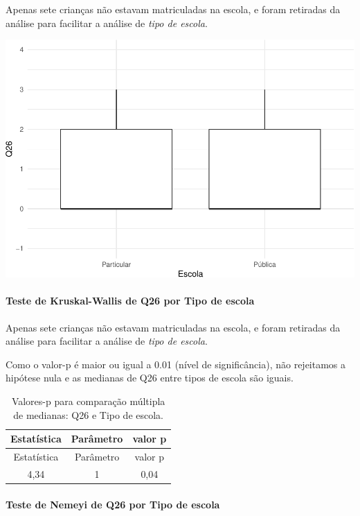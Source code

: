 \documentclass[]{article}
\let\oldparagraph\paragraph
\renewcommand{\paragraph}[1]{\oldparagraph{#1}\mbox{}}
\begin{document}
Apenas sete crianças não estavam matriculadas na escola, e foram retiradas da análise para facilitar a análise de \emph{tipo de escola}.

\begin{center}\includegraphics[width=0.75\linewidth]{relatorio_covid19_files/figure-latex/unnamed-chunk-766-1} \end{center}

\hypertarget{teste-de-kruskal-wallis-de-q26-por-tipo-de-escola}{%
\paragraph{Teste de Kruskal-Wallis de Q26 por Tipo de escola}\label{teste-de-kruskal-wallis-de-q26-por-tipo-de-escola}}

Apenas sete crianças não estavam matriculadas na escola, e foram retiradas da análise para facilitar a análise de \emph{tipo de escola}.

Como o valor-p é maior ou igual a 0.01 (nível de significância), não rejeitamos a hipótese nula e as medianas de Q26 entre tipos de escola são iguais.

\begin{longtable}[]{@{}ccc@{}}
\caption{\label{tab:unnamed-chunk-768}Valores-p para comparação múltipla de medianas: Q26 e Tipo de escola.}\tabularnewline
\toprule
Estatística & Parâmetro & valor p\tabularnewline
\midrule
\endfirsthead
\toprule
Estatística & Parâmetro & valor p\tabularnewline
\midrule
\endhead
4,34 & 1 & 0,04\tabularnewline
\bottomrule
\end{longtable}

\hypertarget{teste-de-nemeyi-de-q26-por-tipo-de-escola}{%
\paragraph{Teste de Nemeyi de Q26 por Tipo de escola}\label{teste-de-nemeyi-de-q26-por-tipo-de-escola}}
\end{document}
